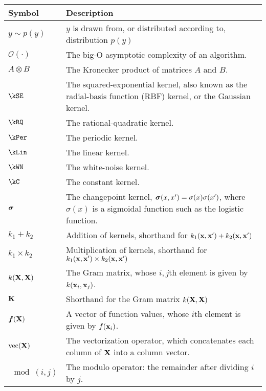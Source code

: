 \begin{tabular}{lm{12cm}}
Symbol \quad     & Description \\
\hline
$y \sim p(y)$       & $y$ is drawn from, or distributed according to, distribution $p(y)$ \\
$\mathcal{O}(\cdot)$ & The big-O asymptotic complexity of an algorithm. \\
$A \otimes B$ & The Kronecker product of matrices $A$ and $B$. \\
$\kSE$ & The squared-exponential kernel, also known as the radial-basis function (RBF) kernel, or the Gaussian kernel. \\
$\kRQ$ & The rational-quadratic kernel. \\
$\kPer$ & The periodic kernel. \\
$\kLin$ & The linear kernel. \\
$\kWN$ & The white-noise kernel. \\
$\kC$ & The constant kernel. \\
$\boldsymbol{\sigma}$ & The changepoint kernel, $\boldsymbol{\sigma}(x, x') = \sigma(x) \sigma(x')$, where $\sigma(x)$ is a sigmoidal function such as the logistic function. \\
$k_1 + k_2$ & Addition of kernels, shorthand for $k_1({\bf{x}}, {\bf{x}}') + k_2({\bf{x}}, {\bf{x}}')$ \\
$k_1 \times k_2$& Multiplication of kernels, shorthand for $k_1({\bf{x}}, {\bf{x}}') \times k_2({\bf{x}}, {\bf{x}}')$ \\
$k(\mathbf{X}, \mathbf{X})$ & The Gram matrix, whose $i,j$th element is given by $k({\bf{x}}_i, {\bf{x}}_j)$. \\
$\mathbf{K}$ & Shorthand for the Gram matrix $k(\mathbf{X}, \mathbf{X})$ \\
$\boldsymbol{f}(\mathbf{X})$ & A vector of function values, whose $i$th element is given by $f({\bf{x}}_i)$. \\
$\textnormal{vec}(\mathbf{X})$ & The vectorization operator, which concatenates each column of $\mathbf{X}$ into a column vector. \\
$\mod(i,j)$ & The modulo operator: the remainder after dividing $i$ by $j$.
\end{tabular}



\outbpdocument{
}


